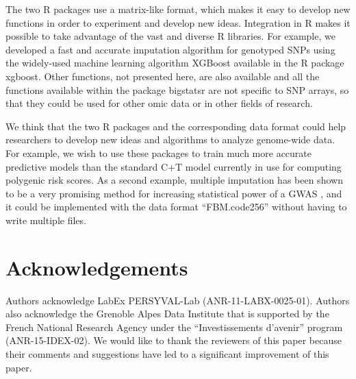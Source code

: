 \documentclass{bioinfo}
\begin{document}
The two R packages use a matrix-like format, which makes it easy to develop new functions in order to experiment and develop new ideas. Integration in R makes it possible to take advantage of the vast and diverse R libraries. For example, we developed a fast and accurate imputation algorithm for genotyped SNPs using the widely-used machine learning algorithm XGBoost available in the R package xgboost. Other functions, not presented here, are also available and all the functions available within the package bigstatsr are not specific to SNP arrays, so that they could be used for other omic data or in other fields of research.

We think that the two R packages and the corresponding data format could help researchers to develop new ideas and algorithms to analyze genome-wide data. For example, we wish to use these packages to train much more accurate predictive models than the standard C+T model currently in use for computing polygenic risk scores. As a second example, multiple imputation has been shown to be a very promising method for increasing statistical power of a GWAS \cite[]{Palmer2016}, and it could be implemented with the data format ``FBM.code256'' without having to write multiple files.



\section*{Acknowledgements}

Authors acknowledge LabEx PERSYVAL-Lab (ANR-11-LABX-0025-01). Authors also acknowledge the Grenoble Alpes Data Institute that is supported by the French National Research Agency under the ``Investissements d'avenir'' program (ANR-15-IDEX-02).
We would like to thank the reviewers of this paper because their comments and suggestions have led to a significant improvement of this paper.

\vspace*{-12pt}



\end{document}
